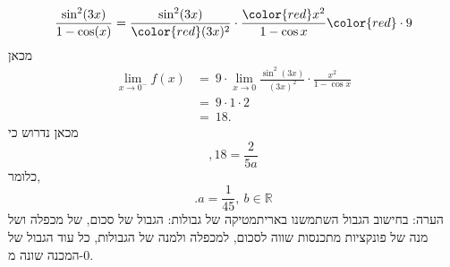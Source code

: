 \begin{enumerate}
\begin{solbox}
    $$\frac{\sin^2(3x)}{1-\cos(x)}=\frac{\sin^2(3x)}{\color{red}(3x)^2}\cdot\frac{\color{red}x^2}{1-\cos x}{\color{red}\cdot9}$$
מכאן
\begin{align*}
\lim_{x\to0^-}f(x)&=\ 9\cdot\lim_{x\to0}\frac{\sin^2(3x)}{(3x)^2}\cdot\frac{x^2}{1-\cos x}\\
&=\ 9\cdot1\cdot2\\
&=\ 18.
\end{align*}
מכאן נדרוש כי
$$,18=\frac{2}{5a}$$
כלומר,
$$.a=\frac{1}{45},\ b\in\mathbb{R}$$
הערה: בחישוב הגבול השתמשנו באריתמטיקה של גבולות: הגבול של סכום, של מכפלה ושל מנה של פונקציות מתכנסות שווה לסכום, למכפלה ולמנה של הגבולות, כל עוד הגבול של המכנה שונה מ-$0$.
\end{solbox}
\end{enumerate}
